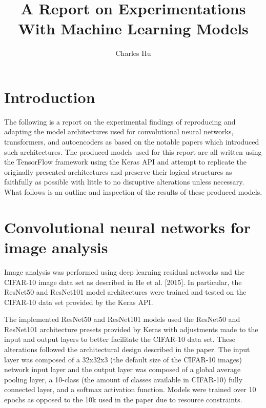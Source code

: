 \documentclass[sigplan]{acmart}
\begin{document}
\title{A Report on Experimentations With Machine Learning Models}

\author{Charles Hu}

\maketitle

\section{Introduction}

The following is a report on the experimental findings of reproducing and adapting the model architectures used for convolutional neural networks, transformers, and autoencoders as based on the notable papers which introduced such architectures. The produced models used for this report are all written using the TensorFlow framework using the Keras API and attempt to replicate the originally presented architectures and preserve their logical structures as faithfully as possible with little to no disruptive alterations unless necessary. What follows is an outline and inspection of the results of these produced models.

\section{Convolutional neural networks for image analysis}

Image analysis was performed using deep learning residual networks and the CIFAR-10 image data set as described in He et al. [2015]. In particular, the ResNet50 and ResNet101 model architectures were trained and tested on the CIFAR-10 data set provided by the Keras API.

The implemented ResNet50 and ResNet101 models used the ResNet50 and ResNet101 architecture presets provided by Keras with adjustments made to the input and output layers to better facilitate the CIFAR-10 data set. These alterations followed the architectural design described in the paper. The input layer was composed of a 32x32x3 (the default size of the CIFAR-10 images) network input layer and the output layer was composed of a global average pooling layer, a 10-class (the amount of classes available in CIFAR-10) fully connected layer, and a softmax activation function. Models were trained over 10 epochs as opposed to the 10k used in the paper due to resource constraints.
\end{document}
